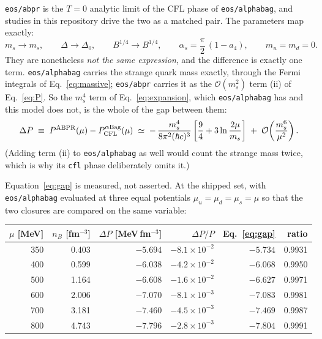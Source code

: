 \documentclass[aps,prc,onecolumn,superscriptaddress,nofootinbib,10pt]{revtex4-2}
\newcommand{\nB}{n_B}
\newcommand{\hc}{(\hbar c)^3}
\newcommand{\as}{\alpha_s}
\newcommand{\ms}{m_s}
\begin{document}
\texttt{eos/abpr} is the $T = 0$ analytic limit of the CFL phase of
\texttt{eos/alphabag}, and studies in this repository drive the two as a
matched pair. The parameters map exactly:
%
\begin{equation}
\ms \to m_s , \qquad
\Delta \to \Delta_0 , \qquad
B^{1/4} \to B^{1/4} , \qquad
\as = \frac{\pi}{2}\,(1 - a_4) , \qquad
m_u = m_d = 0 .
\label{eq:matching}
\end{equation}
%
They are nonetheless \emph{not the same expression}, and the difference is
exactly one term. \texttt{eos/alphabag} carries the strange quark mass exactly,
through the Fermi integrals of Eq.~\eqref{eq:massive}; \texttt{eos/abpr}
carries it as the $\mathcal{O}(\ms^2)$ term (ii) of Eq.~\eqref{eq:P}. So the
$\ms^4$ term of Eq.~\eqref{eq:expansion}, which \texttt{eos/alphabag} has and
this model does not, is the whole of the gap between them:
%
\begin{equation}
\Delta P \;\equiv\; P^{\rm ABPR}(\mu) - P^{\rm \alpha Bag}_{\rm CFL}(\mu)
       \;\simeq\; -\,\frac{\ms^4}{8\pi^2\hc}
                    \left[\frac{9}{4} + 3\ln\frac{2\mu}{\ms}\right]
       \;+\; \mathcal{O}\!\left(\frac{\ms^6}{\mu^2}\right) .
\label{eq:gap}
\end{equation}
%
(Adding term (ii) to \texttt{eos/alphabag} as well would count the strange
mass twice, which is why its \texttt{cfl} phase deliberately omits it.)

Equation~\eqref{eq:gap} is measured, not asserted. At the shipped set, with
\texttt{eos/alphabag} evaluated at three equal potentials $\mu_u = \mu_d =
\mu_s = \mu$ so that the two closures are compared on the same variable:

\begin{center}
\begin{tabular}{rrrrrr}
\toprule
$\mu$ [MeV] & $\nB$ [fm$^{-3}$] & $\Delta P$ [MeV\,fm$^{-3}$]
            & $\Delta P/P$ & Eq.~\eqref{eq:gap} & ratio \\
\midrule
350 & 0.403 & $-5.694$ & $-8.1\times10^{-2}$ & $-5.734$ & 0.9931 \\
400 & 0.599 & $-6.038$ & $-4.2\times10^{-2}$ & $-6.068$ & 0.9950 \\
500 & 1.164 & $-6.608$ & $-1.6\times10^{-2}$ & $-6.627$ & 0.9971 \\
600 & 2.006 & $-7.070$ & $-8.1\times10^{-3}$ & $-7.083$ & 0.9981 \\
700 & 3.181 & $-7.460$ & $-4.5\times10^{-3}$ & $-7.469$ & 0.9987 \\
800 & 4.743 & $-7.796$ & $-2.8\times10^{-3}$ & $-7.804$ & 0.9991 \\
\bottomrule
\end{tabular}
\end{center}
\end{document}
